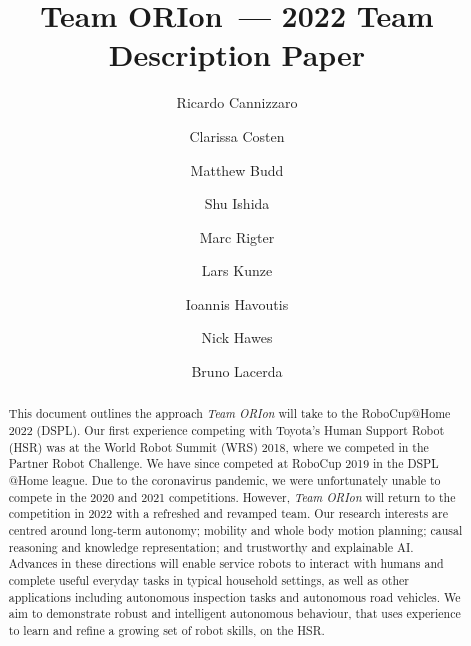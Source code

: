 \documentclass[runningheads,a4paper]{llncs}
\newcommand{\teamori}{Team ORIon}
\begin{document}

\title{\teamori\ --- 2022 Team Description Paper}

\author{Ricardo Cannizzaro \and Clarissa Costen \and Matthew Budd \and Shu Ishida \and Marc Rigter \and Lars Kunze \and Ioannis Havoutis \and Nick Hawes \and Bruno Lacerda}

\maketitle


\begin{abstract}
This document outlines the approach \textit{\teamori} will take to the RoboCup@Home 2022 (DSPL).
Our first experience competing with Toyota's Human Support Robot (HSR) was at the World Robot Summit (WRS) 2018, where we competed in the Partner Robot Challenge. We have since competed at RoboCup 2019 in the DSPL @Home league. Due to the coronavirus pandemic, we were unfortunately unable to compete in the 2020 and 2021 competitions. However, \textit{\teamori} will return to the competition in 2022 with a refreshed and revamped team.
Our research interests are centred around long-term autonomy; mobility and whole body motion planning; causal reasoning and knowledge representation; and trustworthy and explainable AI.
Advances in these directions will enable service robots to interact with humans and complete useful everyday tasks in typical household settings, as well as other applications including autonomous inspection tasks and autonomous road vehicles. 
We aim to demonstrate robust and intelligent autonomous behaviour, that uses experience to learn and refine a growing set of robot skills, on the HSR.
\end{abstract}


\end{document}
